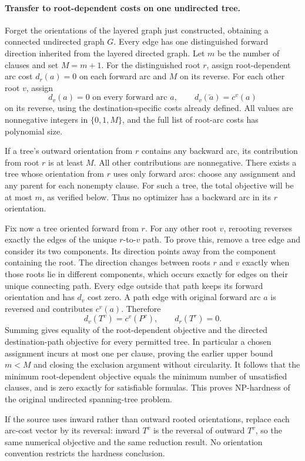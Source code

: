 \documentclass[11pt]{article}
\begin{document}
\paragraph{Transfer to root-dependent costs on one undirected tree.}
Forget the orientations of the layered graph just constructed, obtaining a connected undirected graph $G$. Every edge has one distinguished forward direction inherited from the layered directed graph. Let $m$ be the number of clauses and set $M=m+1$. For the distinguished root $r$, assign root-dependent arc cost $d_r(a)=0$ on each forward arc and $M$ on its reverse. For each other root $v$, assign
\[
d_v(a)=0\text{ on every forward arc }a,\qquad
d_v(\overleftarrow a)=c^v(a)
\]
on its reverse, using the destination-specific costs already defined. All values are nonnegative integers in $\{0,1,M\}$, and the full list of root-arc costs has polynomial size.

If a tree's outward orientation from $r$ contains any backward arc, its contribution from root $r$ is at least $M$. All other contributions are nonnegative. There exists a tree whose orientation from $r$ uses only forward arcs: choose any assignment and any parent for each nonempty clause. For such a tree, the total objective will be at most $m$, as verified below. Thus no optimizer has a backward arc in its $r$ orientation.

Fix now a tree oriented forward from $r$. For any other root $v$, rerooting reverses exactly the edges of the unique $r$-to-$v$ path. To prove this, remove a tree edge and consider its two components. Its direction points away from the component containing the root. The direction changes between roots $r$ and $v$ exactly when those roots lie in different components, which occurs exactly for edges on their unique connecting path. Every edge outside that path keeps its forward orientation and has $d_v$ cost zero. A path edge with original forward arc $a$ is reversed and contributes $c^v(a)$. Therefore
\[
d_v(T^v)=c^v(P^v),\qquad d_r(T^r)=0.
\]
Summing gives equality of the root-dependent objective and the directed destination-path objective for every permitted tree. In particular a chosen assignment incurs at most one per clause, proving the earlier upper bound $m<M$ and closing the exclusion argument without circularity. It follows that the minimum root-dependent objective equals the minimum number of unsatisfied clauses, and is zero exactly for satisfiable formulas. This proves NP-hardness of the original undirected spanning-tree problem.

If the source uses inward rather than outward rooted orientations, replace each arc-cost vector by its reversal: inward $T^v$ is the reversal of outward $T^v$, so the same numerical objective and the same reduction result. No orientation convention restricts the hardness conclusion.
\end{document}
